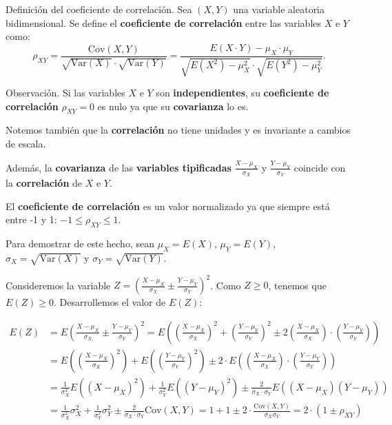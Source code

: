 \documentclass[]{book}
\begin{document}
Definición del coeficiente de correlación.
Sea \((X,Y)\) una variable aleatoria bidimensional. Se define el \textbf{coeficiente de correlación} entre las variables \(X\) e \(Y\) como:
\[
\rho_{XY}=\frac{\mathrm{Cov}(X,Y)}{\sqrt{\mathrm{Var}(X)}\cdot\sqrt{\mathrm{Var}(Y)}}=\frac{E(X\cdot Y)-\mu_X\cdot \mu_Y}{\sqrt{E\left(X^2\right)-\mu_X^2}\cdot \sqrt{E\left(Y^2\right)-\mu_Y^2}}.
\]

Observación.
Si las variables \(X\) e \(Y\) son \textbf{independientes}, su \textbf{coeficiente de correlación} \(\rho_{XY}=0\) es nulo ya que su \textbf{covarianza} lo es.

Notemos también que la \textbf{correlación} no tiene unidades y es invariante a cambios de escala.

Además, la \textbf{covarianza} de las \textbf{variables tipificadas} \(\frac{X-\mu_X}{\sigma_X}\) y \(\frac{Y-\mu_Y}{\sigma_Y}\) coincide con la \textbf{correlación} de \(X\) e \(Y\).

El \textbf{coeficiente de correlación} es un valor normalizado ya que siempre está entre -1 y 1: \(-1\leq\rho_{XY}\leq 1\).

Para demostrar de este hecho, sean \(\mu_X=E(X)\), \(\mu_Y=E(Y)\), \(\sigma_X=\sqrt{\mathrm{Var}(X)}\) y \(\sigma_Y=\sqrt{\mathrm{Var}(Y)}\).

Consideremos la variable \(Z=\left(\frac{X-\mu_X}{\sigma_X}\pm \frac{Y-\mu_Y}{\sigma_Y}\right)^2\). Como \(Z\geq 0\), tenemos que \(E(Z)\geq 0\). Desarrollemos el valor de \(E(Z)\):

\[
\begin{array}{rl}
E(Z) & = E\left(\frac{X-\mu_X}{\sigma_X}\pm \frac{Y-\mu_Y}{\sigma_Y}\right)^2 = E\left(\left(\frac{X-\mu_X}{\sigma_X}\right)^2+\left(\frac{Y-\mu_Y}{\sigma_Y}\right)^2\pm 2\left(\frac{X-\mu_X}{\sigma_X}\right)\cdot  \left(\frac{Y-\mu_Y}{\sigma_Y}\right)\right) \\ & =
E\left(\left(\frac{X-\mu_X}{\sigma_X}\right)^2\right)+E\left(\left(\frac{Y-\mu_Y}{\sigma_Y}\right)^2\right)\pm 2\cdot  E\left(\left(\frac{X-\mu_X}{\sigma_X}\right) \cdot \left(\frac{Y-\mu_Y}{\sigma_Y}\right)\right) \\ & =
\frac{1}{\sigma_X^2}E\left(\left(X-\mu_X\right)^2\right)+\frac{1}{\sigma_Y^2}E\left(\left(Y-\mu_Y\right)^2\right)\pm \frac{2}{\sigma_X\cdot \sigma_Y}E\left(\left(X-\mu_X\right) \left(Y-\mu_Y\right)\right) \\ & = \frac{1}{\sigma_X^2}\sigma_X^2+
\frac{1}{\sigma_Y^2}\sigma_Y^2 \pm\frac{2}{\sigma_X\cdot \sigma_Y} \mathrm{Cov}(X,Y) = 1+1\pm 2\cdot \frac{\mathrm{Cov}(X,Y)}{\sigma_X\sigma_Y}=2\cdot (1\pm\rho_{XY})
\end{array}
\]
\end{document}
